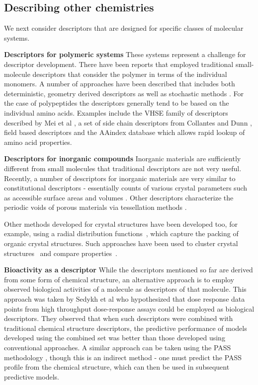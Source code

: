\documentclass[letterpaper, 12pt]{article}
\begin{document}
\subsection{Describing other chemistries}

We next consider descriptors that are designed for specific classes of
molecular systems.

\textbf{Descriptors for polymeric systems} These systems represent a
challenge for descriptor development. There have been reports that
employed traditional small-molecule descriptors
\cite{Mattioni:2002dq,Katritzky:1998cr} that consider the polymer in
terms of the individual monomers. A number of approaches have been
described that includes both deterministic, geometry derived
descriptors \cite{Edvinsson:2003bh} as well as stochastic methods
\cite{Gonzales-Diaz:2003ly}. For the case of polypeptides the
descriptors generally tend to be based on the individual amino
acids. Examples include the VHSE family of descriptors described by
Mei et al \cite{Mei:2005kx}, a set of side chain descriptors from
Collantes and Dunn \cite{Collantes:1995vn}, field based descriptors
\cite{Norinder:1991ys} and the AAindex database
\cite{Kawashima:1999zr} which allows rapid lookup of amino acid
properties.

\textbf{Descriptors for inorganic compounds} Inorganic materials are
sufficiently different from small molecules that traditional
descriptors are not very useful. Recently, a number of descriptors for
inorganic materials are very similar to constitutional descriptors -
essentially counts of various crystal parameters such as accessible
surface areas and volumes
\cite{Willems:2012zr,Haranczyk:2010ys,Mackay:1984ve}. Other
descriptors characterize the periodic voids of porous materials via
tessellation methods \cite{Anurova:2009ly,Carr:2009kx}.

Other methods developed for crystal structures have been developed
too, for example, using a radial distribution
functions~\cite{Willighagen2005}, which capture the packing of organic
crystal structures. Such approaches have been used to cluster crystal
structures~\cite{Wehrens2006} and compare
properties~\cite{Willighagen2007}.

\textbf{Bioactivity as a descriptor} While the descriptors mentioned
so far are derived from some form of chemical structure, an
alternative approach is to employ observed biological activities of a
molecule as descriptors of that molecule.  This approach was taken by
Sedykh et al \cite{Sedykh:2011fk} who hypothesized that dose response
data points from high throughput dose-response assays could be employed
as biological descriptors. They observed that when such descriptors
were combined with traditional chemical structure descriptors, the
predictive performance of models developed using the combined set was
better than those developed using conventional approaches. A similar
approach can be taken using the PASS methodology
\cite{Poroikov:2007aa}, though this is an indirect method - one must
predict the PASS profile from the chemical structure, which can then
be used in subsequent predictive models.
\end{document}
